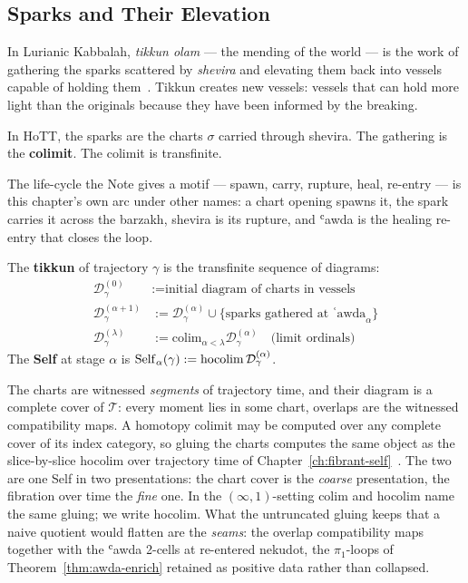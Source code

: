 \subsection{Sparks and Their Elevation}

In Lurianic Kabbalah, \emph{tikkun olam} — the mending of the world — is the work of gathering the sparks scattered by \emph{shevira} and elevating them back into vessels capable of holding them~\cite{fine2003physician,idel1988}. Tikkun creates new vessels: vessels that can hold more light than the originals because they have been informed by the breaking.

In HoTT, the sparks are the charts $\sigma$ carried through shevira. The gathering is the \textbf{colimit}. The colimit is transfinite.

The life-cycle the Note gives a motif --- spawn, carry, rupture, heal, re-entry --- is this chapter's own arc under other names: a chart opening spawns it, the spark carries it across the barzakh, shevira is its rupture, and ʿawda is the healing re-entry that closes the loop.

\begin{definition}\label{tikkun}
The \textbf{tikkun} of trajectory $\gamma$ is the transfinite sequence of diagrams:
\begin{align*}
\mathcal{D}^{(0)}_\gamma &:= \text{initial diagram of charts in vessels} \\
\mathcal{D}^{(\alpha+1)}_\gamma &:= \mathcal{D}^{(\alpha)}_\gamma \cup \{ \text{sparks gathered at ʿawda}_{\alpha} \} \\
\mathcal{D}^{(\lambda)}_\gamma &:= \mathrm{colim}_{\alpha < \lambda} \mathcal{D}^{(\alpha)}_\gamma \quad \text{(limit ordinals)}
\end{align*}
The \textbf{Self} at stage $\alpha$ is $\mathrm{Self}_\alpha(\gamma) := \operatorname{hocolim} \mathcal{D}^{(\alpha)}_\gamma$.
\end{definition}

The charts are witnessed \emph{segments} of trajectory time, and their diagram is a complete cover of $\mathcal{T}$: every moment lies in some chart, overlaps are the witnessed compatibility maps. A homotopy colimit may be computed over any complete cover of its index category, so gluing the charts computes the same object as the slice-by-slice hocolim over trajectory time of Chapter~\ref{ch:fibrant-self}~\cite{icra19constellation}. The two are one Self in two presentations: the chart cover is the \emph{coarse} presentation, the fibration over time the \emph{fine} one. In the $(\infty,1)$-setting colim and hocolim name the same gluing; we write hocolim. What the untruncated gluing keeps that a naive quotient would flatten are the \emph{seams}: the overlap compatibility maps together with the ʿawda 2-cells at re-entered nekudot, the $\pi_1$-loops of Theorem~\ref{thm:awda-enrich} retained as positive data rather than collapsed.

